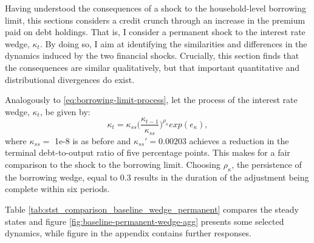 \documentclass[12pt]{article} %
\numberwithin{equation}{section} %
\numberwithin{figure}{section}
\numberwithin{table}{section}
\begin{document}
Having understood the consequences of a shock to the household-level borrowing limit, this sections considers a credit crunch through an increase in the premium paid on debt holdings. That is, I consider a permanent shock to the interest rate wedge, $\kappa_t$. By doing so, I aim at identifying the similarities and differences in the dynamics induced by the two financial shocks. Crucially, this section finds that the consequences are similar qualitatively, but that important quantitative and distributional divergences do exist. 

Analogously to \eqref{eq:borrowing-limit-process}, let the process of the interest rate wedge, $\kappa_t$, be given by:
\begin{equation}
    \kappa_t = \kappa_{ss} \Bigg( \frac{\kappa_{t-1}}{\kappa_{ss}} \Bigg)^{\rho_{\kappa}} exp(e_{\kappa}), \label{eq:wedge-process}
\end{equation}
where $\kappa_{ss} =$ 1e-8 is as before and $\kappa_{ss}' = 0.00203$ achieves a reduction in the terminal debt-to-output ratio of five percentage points. This makes for a fair comparison to the shock to the borrowing limit. Choosing $\rho_{\kappa}$, the persistence of the borrowing wedge, equal to $0.3$ results in the duration of the adjustment being complete within six periods. 

Table \ref{tab:stst_comparison_baseline_wedge_permanent} compares the steady states and figure \ref{fig:baseline-permanent-wedge-agg} presents some selected dynamics, while figure in the appendix contains further responses.
\end{document}
